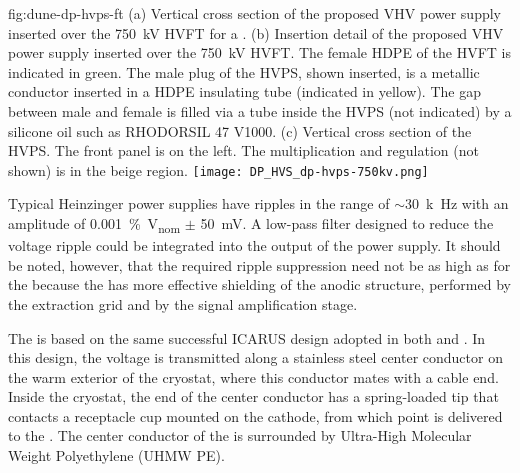 \begin{dunefigure}
{fig:dune-dp-hvps-ft}
{(a) Vertical cross section of the proposed VHV power supply inserted over the \SI{750}{kV} HVFT for a \dpmod{}. 
(b) Insertion detail of the proposed VHV power supply inserted over the \SI{750}{kV} HVFT. The female HDPE of the HVFT is indicated in green. The male plug of the HVPS, shown inserted, is a metallic conductor inserted in a HDPE insulating tube (indicated in yellow). The gap between male and female is filled via a tube inside the HVPS (not indicated) by a silicone oil such as RHODORSIL 47 V1000. (c) Vertical cross section of the HVPS. The front panel is on the left. The  multiplication and regulation (not shown) is in the beige region.}
\texttt{[image: DP\_HVS\_dp-hvps-750kv.png]}
\end{dunefigure}


Typical Heinzinger power supplies have ripples in the range of $\sim$\SI{30}{k\hertz} with an amplitude of \SI{0.001}{\%V_{nom}} $\pm$ \SI{50}{mV}. A low-pass  filter designed to reduce the voltage ripple could be integrated into the output of the power supply.  It should be noted, however, that the required ripple suppression need not be as high as for the  because the  has more effective shielding of the anodic structure, performed by the extraction grid and by the  signal amplification stage. 


The  \fdth is based on the same successful ICARUS design adopted in both  and .  In this design, the voltage is transmitted along a stainless steel center conductor on the warm exterior of the cryostat, where this conductor mates with a cable end.  Inside the cryostat, the end of the center conductor has a spring-loaded tip that  contacts a receptacle cup mounted on the cathode, from which point  is delivered to the .  The center conductor of the \fdth is surrounded by Ultra-High Molecular Weight Polyethylene (UHMW PE).  


